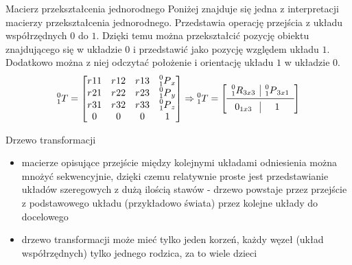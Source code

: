 
\begin{frame}
{Macierz przekształcenia jednorodnego}
Poniżej znajduje się jedna z interpretacji macierzy przekształcenia jednorodnego.
Przedstawia operację przejścia z układu współrzędnych $0$ do $1$. 
Dzięki temu można przekształcić pozycję obiektu znajdującego się w układzie $0$ i przedstawić jako pozycję względem układu $1$.
Dodatkowo można z niej odczytać położenie i orientację układu $1$ w układzie $0$.
\begin{equation*}
	\prescript{0}{1}T = 
	\begin{bmatrix}
		r_{}11 	& r_{}12	&	r_{}13	& \prescript{0}{1}P_x \\
		r_{}21 	& r_{}22	&	r_{}23	& \prescript{0}{1}P_y \\
		r_{}31 	& r_{}32	& r_{}33	& \prescript{0}{1}P_z \\
		0				&	0				&	0				&	1										\\
	\end{bmatrix}
	\Rightarrow
		\prescript{0}{1}T = 
	 \left[ \begin{array}{c|c}
   \prescript{0}{1}R_{3x3} 	& \prescript{0}{1}P_{3x1} \\
   \midrule
   0_{1x3}									& 1												\\
\end{array}\right]
\end{equation*}
\end{frame}



\begin{frame}
{Drzewo transformacji}
	\begin{itemize}
		\item 
		macierze opisujące przejście między kolejnymi układami odniesienia można mnożyć sekwencyjnie, dzięki czemu relatywnie proste jest przedstawianie układów szeregowych z dużą ilością stawów - drzewo powstaje przez przejście z podstawowego układu (przykładowo świata) przez kolejne układy do docelowego
		\item drzewo transformacji może mieć tylko jeden korzeń, każdy węzeł (układ współrzędnych) tylko jednego rodzica, za to wiele dzieci
	\end{itemize}
	
	
\end{frame}

